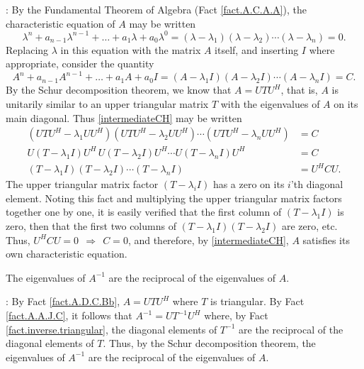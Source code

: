 \/: By the Fundamental Theorem of Algebra (Fact \ref{fact.A.C.A.A}), the characteristic equation of $A$ may be written
\begin{equation*}
    \lambda^{n}+a_{n-1}\lambda^{n-1}+\ldots + a_{1}\lambda +a_{0} \lambda^0=
    (\lambda - \lambda_{1})(\lambda-\lambda_{2})\cdots (\lambda-\lambda_{n})=0.
\end{equation*}
Replacing $\lambda$ in this equation with the matrix $A$ itself, and inserting $I$ where appropriate,
consider the quantity
\begin{equation}
    A^{n}+a_{n-1}A^{n-1}+\ldots + a_{1}A+a_{0} I =
    (A - \lambda_{1}I)(A -\lambda_{2}I)\cdots (A -\lambda_{n}I) = C.
    \label{intermediateCH}
\end{equation}
By the Schur decomposition theorem, we know that $A=UTU^{H}$, that is,
$A$ is unitarily similar to an upper triangular matrix $T$ with the eigenvalues of $A$
on its main diagonal.  Thus \eqref{intermediateCH} may be written
\begin{align*}
    (UTU^{H} - \lambda_{1}UU^{H})(UTU^{H} -\lambda_{2}UU^{H})\cdots (UTU^{H} -\lambda_{n}UU^{H}) &= C \\
    U(T - \lambda_{1}I)U^{H}\,U(T -\lambda_{2}I)U^{H}\cdots U(T -\lambda_{n}I) U^{H} &= C \\
    (T - \lambda_{1}I) (T -\lambda_{2}I) \cdots (T -\lambda_{n}I)  &= U^{H} C U.
\end{align*}
The upper triangular matrix factor $(T-\lambda_{i}I)$ has a zero on its $i$'th diagonal
element.  Noting this fact and multiplying the upper triangular matrix factors together one by one, it is
easily verified that the first column of $(T - \lambda_{1}I)$ is zero, then that
the first two columns of $(T - \lambda_{1}I) (T -\lambda_{2}I)$ are
zero, etc.  Thus, $U^{H}CU=0\ \ \Rightarrow\ \ C=0$, and therefore, by
\eqref{intermediateCH}, $A$ satisfies its own characteristic equation.  \endproof 

\begin{fact} \label{fact.A.D.C.Bd} The eigenvalues of $A^{-1}$ are the reciprocal of the eigenvalues of $A$.
\end{fact}

\/: By Fact \ref{fact.A.D.C.Bb}, $A=UTU^{H}$ where $T$ is triangular.  By
Fact \ref{fact.A.A.J.C}, it follows that $A^{-1}=UT^{-1}U^{H}$ where, by Fact \ref{fact.inverse.triangular}, the
diagonal elements of $T^{-1}$ are the reciprocal of the diagonal
elements of $T$.  Thus, by the Schur decomposition theorem, the eigenvalues of $A^{-1}$ are the
reciprocal of the eigenvalues of $A$. \endproof


